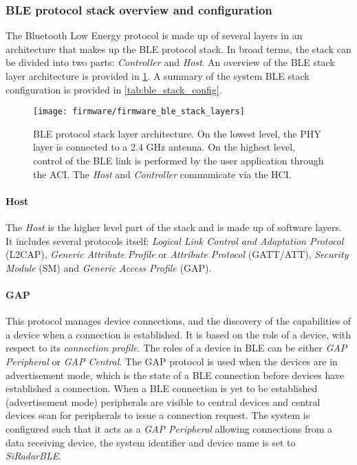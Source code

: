 \subsubsection{BLE protocol stack overview and configuration} \label{sec:ble_stack}

The Bluetooth Low Energy protocol is made up of several layers in an architecture that makes up the BLE protocol stack. In broad terms, the stack can be divided into two parts: \textit{Controller} and \textit{Host}. An overview of the BLE stack layer architecture is provided in \cref{fig:firmware_ble_stack_layers}. A summary of the system BLE stack configuration is provided in \cref{tab:ble_stack_config}.

\begin{figure}[ht]
	\centering
	\texttt{[image: firmware/firmware\_ble\_stack\_layers]}
	\caption{BLE protocol stack layer architecture. On the lowest level, the PHY layer is connected to a 2.4 GHz antenna. On the highest level, control of the BLE link is performed by the user application through the ACI. The \textit{Host} and \textit{Controller} communicate via the HCI.}
	\label{fig:firmware_ble_stack_layers}
\end{figure}

\paragraph{Host}

The \textit{Host} is the higher level part of the stack and is made up of software layers. It includes several protocols itself: \textit{Logical Link Control and Adaptation Protocol} (L2CAP), \textit{Generic Attribute Profile} or \textit{Attribute Protocol} (GATT/ATT), \textit{Security Module} (SM) and \textit{Generic Access Profile} (GAP).

\paragraph{GAP}
This protocol manages device connections, and the discovery of the capabilities of a device when a connection is established. It is based on the role of a device, with respect to its \textit{connection profile}. The roles of a device in BLE can be either \textit{GAP Peripheral} or \textit{GAP Central}. The GAP protocol is used when the devices are in advertisement mode, which is the state of a BLE connection before devices have established a connection. When a BLE connection is yet to be established (advertisement mode) peripherals are visible to central devices and central devices scan for peripherals to issue a connection request. The system is configured such that it acts as a \textit{GAP Peripheral} allowing connections from a data receiving device, the system identifier and device name is set to \textit{SiRadarBLE}.

